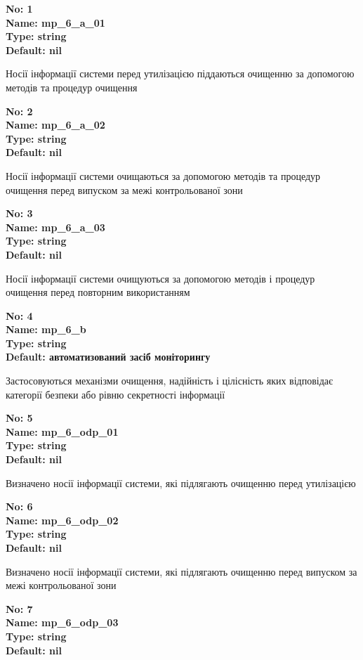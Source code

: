 \documentclass{article}
\begin{document}
\vspace{10pt}
{\footnotesize\bfseries
No: 1\\
Name: mp\_6\_a\_01\\
Type: string\\
Default: nil
}

{\footnotesize Носії інформації системи перед утилізацією піддаються очищенню за допомогою методів та процедур очищення}


{\footnotesize\bfseries
No: 2\\
Name: mp\_6\_a\_02\\
Type: string\\
Default: nil
}

{\footnotesize Носії інформації системи очищаються за допомогою методів та процедур очищення перед випуском за межі контрольованої зони}


{\footnotesize\bfseries
No: 3\\
Name: mp\_6\_a\_03\\
Type: string\\
Default: nil
}

{\footnotesize Носії інформації системи очищуються за допомогою методів і процедур очищення перед повторним використанням}


{\footnotesize\bfseries
No: 4\\
Name: mp\_6\_b\\
Type: string\\
Default: \textquotedbl{}автоматизований засіб моніторингу\textquotedbl{}
}

{\footnotesize Застосовуються механізми очищення, надійність і цілісність яких відповідає категорії безпеки або рівню секретності інформації}


{\footnotesize\bfseries
No: 5\\
Name: mp\_6\_odp\_01\\
Type: string\\
Default: nil
}

{\footnotesize Визначено носії інформації системи, які підлягають очищенню перед утилізацією}


{\footnotesize\bfseries
No: 6\\
Name: mp\_6\_odp\_02\\
Type: string\\
Default: nil
}

{\footnotesize Визначено носії інформації системи, які підлягають очищенню перед випуском за межі контрольованої зони}


{\footnotesize\bfseries
No: 7\\
Name: mp\_6\_odp\_03\\
Type: string\\
Default: nil
}
\end{document}
